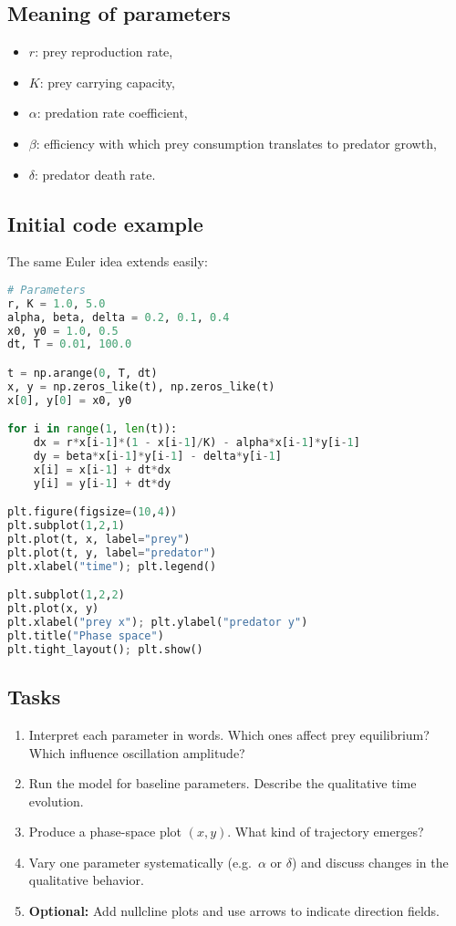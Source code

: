 \documentclass[11pt,a4paper]{article}
\begin{document}
\subsection{Meaning of parameters}
\begin{itemize}[leftmargin=2em,itemsep=0.2em]
  \item $r$: prey reproduction rate,
  \item $K$: prey carrying capacity,
  \item $\alpha$: predation rate coefficient,
  \item $\beta$: efficiency with which prey consumption translates to predator growth,
  \item $\delta$: predator death rate.
\end{itemize}

\subsection{Initial code example}
The same Euler idea extends easily:

\begin{lstlisting}[language=Python,caption={Predator-prey simulation (Euler scheme)}]
# Parameters
r, K = 1.0, 5.0
alpha, beta, delta = 0.2, 0.1, 0.4
x0, y0 = 1.0, 0.5
dt, T = 0.01, 100.0

t = np.arange(0, T, dt)
x, y = np.zeros_like(t), np.zeros_like(t)
x[0], y[0] = x0, y0

for i in range(1, len(t)):
    dx = r*x[i-1]*(1 - x[i-1]/K) - alpha*x[i-1]*y[i-1]
    dy = beta*x[i-1]*y[i-1] - delta*y[i-1]
    x[i] = x[i-1] + dt*dx
    y[i] = y[i-1] + dt*dy

plt.figure(figsize=(10,4))
plt.subplot(1,2,1)
plt.plot(t, x, label="prey")
plt.plot(t, y, label="predator")
plt.xlabel("time"); plt.legend()

plt.subplot(1,2,2)
plt.plot(x, y)
plt.xlabel("prey x"); plt.ylabel("predator y")
plt.title("Phase space")
plt.tight_layout(); plt.show()
\end{lstlisting}

\subsection{Tasks}
\begin{enumerate}[label=\textbf{P\arabic*},leftmargin=*]
  \item Interpret each parameter in words. Which ones affect prey equilibrium? Which influence oscillation amplitude?
  \item Run the model for baseline parameters. Describe the qualitative time evolution.
  \item Produce a phase-space plot $(x,y)$. What kind of trajectory emerges?
  \item Vary one parameter systematically (e.g.\ $\alpha$ or $\delta$) and discuss changes in the qualitative behavior.
  \item \textbf{Optional:} Add nullcline plots and use arrows to indicate direction fields.
\end{enumerate}
\end{document}
